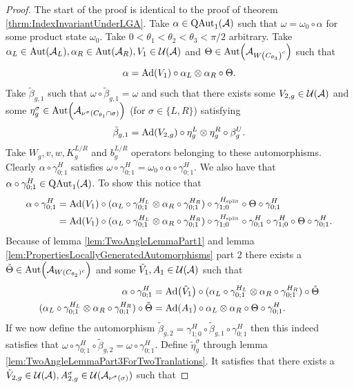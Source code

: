 \documentclass[12pt,a4paper,twoside]{article}
\numberwithin{equation}{section}
\begin{document}
\begin{proof}
	The start of the proof is identical to the proof of theorem \ref{thrm:IndexInvariantUnderLGA}. Take $\alpha\in\QAut{\AA}$ such that $\omega=\omega_0\circ\alpha$ for some product state $\omega_0$. Take $0<\theta_1<\theta_2<\theta_3<\pi/2$ arbitrary. Take $\alpha_L\in\Aut{\AA_L},\alpha_R\in\Aut{\AA_R},V_1\in\UU(\AA)$ and $\Theta\in\Aut{\AA_{W\left(C_{\theta_3}\right)^c}}$ such that
	\begin{equation}
		\alpha=\Ad{V_1}\circ\alpha_L\otimes\alpha_R\circ\Theta.
	\end{equation}
	Take $\tilde{\beta}_{g,1}$ such that $\omega\circ\tilde{\beta}_{g,1}=\omega$ and such that there exists some $V_{2,g}\in\mathcal U(\mathcal A)$ and some $\eta_g^{\sigma}\in\Aut{\AA_{\nu^{\sigma}(C_{\theta_1}\cap\sigma)}}$ (for $\sigma\in\{L,R\}$) satisfying
	\begin{equation}
		\tilde{\beta}_{g,1}=\Ad{V_{2,g}}\circ\eta_{g}^L\otimes\eta_{g}^R\circ\beta_g^U.
	\end{equation}
	Take $W_g,v,w,K_g^{L/R}$ and $b_g^{L/R}$ operators belonging to these automorphisms. Clearly $\alpha\circ\gamma^H_{0;1}$ satisfies $\omega\circ\gamma^{H}_{0;1}=\omega_0\circ\alpha\circ\gamma^{H}_{0;1}$. We also have that $\alpha\circ\gamma^H_{0;1}\in\QAut{\AA}$. To show this notice that
	\begin{align}
		\alpha\circ\gamma^H_{0;1}&=\Ad{V_1}\circ(\alpha_L\circ\gamma^{H_L}_{0;1}\otimes\alpha_R\circ\gamma^{H_R}_{0;1})\circ\gamma^{H_\text{split}}_{1;0}\circ\Theta\circ\gamma^H_{0;1}\\
		&=\Ad{V_1}\circ(\alpha_L\circ\gamma^{H_L}_{0;1}\otimes\alpha_R\circ\gamma^{H_R}_{0;1})\circ\gamma^{H_\text{split}}_{1;0}\circ\gamma^{H}_{0;1}\circ\gamma^{H}_{1;0}\circ\Theta\circ\gamma^H_{0;1}.
	\end{align}
	Because of lemma \ref{lem:TwoAngleLemmaPart1} and lemma \ref{lem:PropertiesLocallyGeneratedAutomorphisms} part 2 there exists a $\tilde{\Theta}\in\Aut{\AA_{W(C_{\theta_2})^c}}$ and some $\tilde V_1,A_1\in\mathcal U(\mathcal A)$ such that
	\begin{align}
		\alpha\circ\gamma^H_{0;1}&=\Ad{\tilde V_1}\circ(\alpha_L\circ\gamma^{H_L}_{0;1}\otimes\alpha_R\circ\gamma^{H_R}_{0;1})\circ\tilde\Theta\\
		(\alpha_L\circ\gamma^{H_L}_{0;1}\otimes\alpha_R\circ\gamma^{H_R}_{0;1})\circ\tilde\Theta&=\Ad{A_1}\circ \alpha_L\otimes\alpha_R\circ\Theta\circ\gamma^{H}_{0;1}.
	\end{align}
	If we now define the automorphism $\tilde{\beta}_{g,2}=\gamma^{H}_{1;0}\circ\tilde\beta_{g,1}\circ\gamma^{H}_{0;1}$ then this indeed satisfies that $\omega\circ\gamma^{H}_{0;1}\circ\tilde{\beta}_{g,2}=\omega\circ\gamma^{H}_{0;1}$. Define $\tilde\eta_g^\sigma$ through lemma \ref{lem:TwoAngleLemmaPart3ForTwoTranlations}. It satisfies that there exists a $\tilde V_{2,g}\in\mathcal U(\mathcal A),A_{2,g}^{\sigma}\in\mathcal U(\mathcal A_{\nu^{\sigma}(\sigma)})$ such that

\end{proof}
\end{document}
